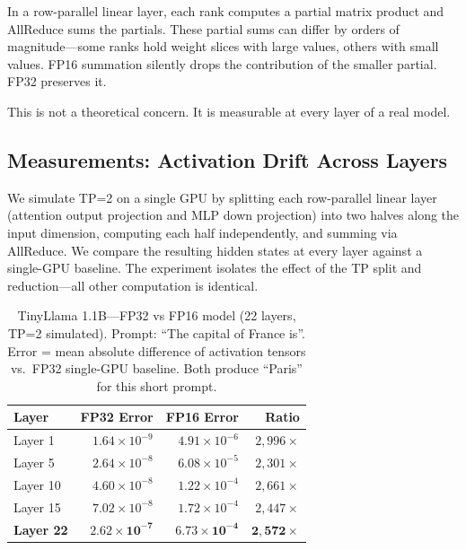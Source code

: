 \documentclass[10pt,twocolumn]{article}
\begin{document}
In a row-parallel linear layer, each rank computes a partial matrix
product and AllReduce sums the partials.  These partial sums can differ by
orders of magnitude---some ranks hold weight slices with large values,
others with small values.  FP16 summation silently drops the contribution
of the smaller partial.  FP32 preserves it.

This is not a theoretical concern.  It is measurable at every layer of a
real model.

\subsection{Measurements: Activation Drift Across Layers}\label{sec:prec-measure}

We simulate TP=2 on a single GPU by splitting each row-parallel linear
layer (attention output projection and MLP down projection) into two
halves along the input dimension, computing each half independently, and
summing via AllReduce.  We compare the resulting hidden states at every
layer against a single-GPU baseline.  The experiment isolates the effect
of the TP split and reduction---all other computation is identical.

\begin{table}[t]
\centering
\caption{TinyLlama 1.1B---FP32 vs FP16 model (22 layers, TP=2 simulated).
Prompt: ``The capital of France is''.  Error = mean absolute difference of
activation tensors vs.\ FP32 single-GPU baseline.  Both produce ``Paris''
for this short prompt.}
\label{tab:tinyllama}
\smallskip
\begin{tabular}{@{}lrrr@{}}
\toprule
Layer & FP32 Error & FP16 Error & Ratio \\
\midrule
Layer 1  & $1.64\!\times\!10^{-9}$ & $4.91\!\times\!10^{-6}$ & $2{,}996\times$ \\
Layer 5  & $2.64\!\times\!10^{-8}$ & $6.08\!\times\!10^{-5}$ & $2{,}301\times$ \\
Layer 10 & $4.60\!\times\!10^{-8}$ & $1.22\!\times\!10^{-4}$ & $2{,}661\times$ \\
Layer 15 & $7.02\!\times\!10^{-8}$ & $1.72\!\times\!10^{-4}$ & $2{,}447\times$ \\
\textbf{Layer 22} & $\mathbf{2.62\!\times\!10^{-7}}$ & $\mathbf{6.73\!\times\!10^{-4}}$ & $\mathbf{2{,}572\times}$ \\
\bottomrule
\end{tabular}
\end{table}
\end{document}
